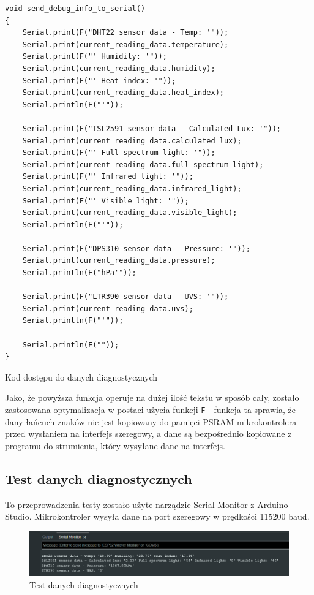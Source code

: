 \documentclass[12pt,a4paper]{article}
\begin{document}
\begin{code}[H]
\begin{verbatim}
void send_debug_info_to_serial()
{
    Serial.print(F("DHT22 sensor data - Temp: '"));
    Serial.print(current_reading_data.temperature);
    Serial.print(F("' Humidity: '"));
    Serial.print(current_reading_data.humidity);
    Serial.print(F("' Heat index: '"));
    Serial.print(current_reading_data.heat_index);
    Serial.println(F("'"));

    Serial.print(F("TSL2591 sensor data - Calculated Lux: '"));
    Serial.print(current_reading_data.calculated_lux);
    Serial.print(F("' Full spectrum light: '"));
    Serial.print(current_reading_data.full_spectrum_light);
    Serial.print(F("' Infrared light: '"));
    Serial.print(current_reading_data.infrared_light);
    Serial.print(F("' Visible light: '"));
    Serial.print(current_reading_data.visible_light);
    Serial.println(F("'"));

    Serial.print(F("DPS310 sensor data - Pressure: '"));
    Serial.print(current_reading_data.pressure);
    Serial.println(F("hPa'"));

    Serial.print(F("LTR390 sensor data - UVS: '"));
    Serial.print(current_reading_data.uvs);
    Serial.println(F("'"));

    Serial.println(F(""));
}
\end{verbatim}
\caption{Kod dostępu do danych diagnostycznych}
\label{diagnostic-data-code}
\end{code}

Jako, że powyższa funkcja operuje na dużej ilość tekstu w sposób cały, zostało zastosowana optymalizacja w postaci użycia funkcji 
\texttt{F} - funkcja ta sprawia, że dany łańcuch znaków nie jest kopiowany do pamięci PSRAM mikrokontrolera przed wysłaniem na interfejs szeregowy, 
a dane są bezpośrednio kopiowane z programu do strumienia, który wysyłane dane na interfejs. 

\subsection{Test danych diagnostycznych}

To przeprowadzenia testy zostało użyte narządzie Serial Monitor z Arduino Studio. Mikrokontroler wysyła dane na port szeregowy w prędkości 115200 baud.

\begin{figure}[H]
    \centering
    \includegraphics[width=\textwidth]{diagnostic-data.png}
    \caption{Test danych diagnostycznych}
\end{figure}
\end{document}
